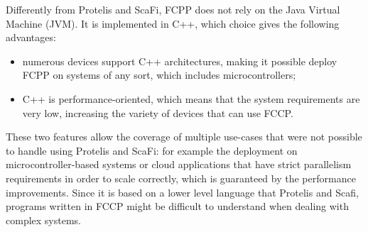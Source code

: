 Differently from Protelis and ScaFi, FCPP does not rely on the Java Virtual Machine (JVM). It is implemented in C++, which choice gives the following advantages:
\begin{itemize}
    \item numerous devices support C++ architectures, making it possible deploy FCPP on systems of any sort, which includes microcontrollers;
    \item C++ is performance-oriented, which means that the system requirements are very low, increasing the variety of devices that can use FCCP.
\end{itemize}

These two features allow the coverage of multiple use-cases that were not possible to handle using Protelis and ScaFi: for example the deployment on microcontroller-based systems or cloud applications that have strict parallelism requirements in order to scale correctly, which is guaranteed by the performance improvements.\newline
Since it is based on a lower level language that Protelis and Scafi, programs written in FCCP might be difficult to understand when dealing with complex systems.

